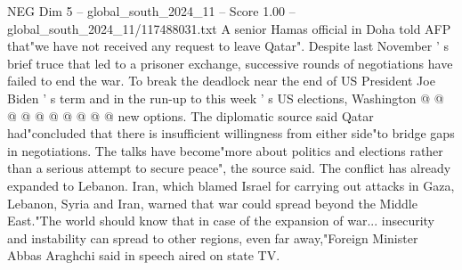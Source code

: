 \begin{textsample}{NEG Dim 5 – global\_south\_2024\_11 – Score 1.00 – global\_south\_2024\_11/117488031.txt}
A senior Hamas official in Doha told AFP that"we have not received any request to leave Qatar".
Despite last November ' s brief truce that led to a prisoner exchange, successive rounds of negotiations have failed to end the war.
To break the deadlock near the end of US President Joe Biden ' s term and in the run-up to this week ' s US elections, Washington @ @ @ @ @ @ @ @ @ @ new options.
The diplomatic source said Qatar had"concluded that there is insufficient willingness from either side"to bridge gaps in negotiations.
The talks have become"more about politics and elections rather than a serious attempt to secure peace", the source said.
The conflict has already expanded to Lebanon.
Iran, which blamed Israel for carrying out attacks in Gaza, Lebanon, Syria and Iran, warned that war could spread beyond the Middle East."The world should know that in case of the expansion of war... insecurity and instability can spread to other regions, even far away,"Foreign Minister Abbas Araghchi said in speech aired on state TV.

\end{textsample}
